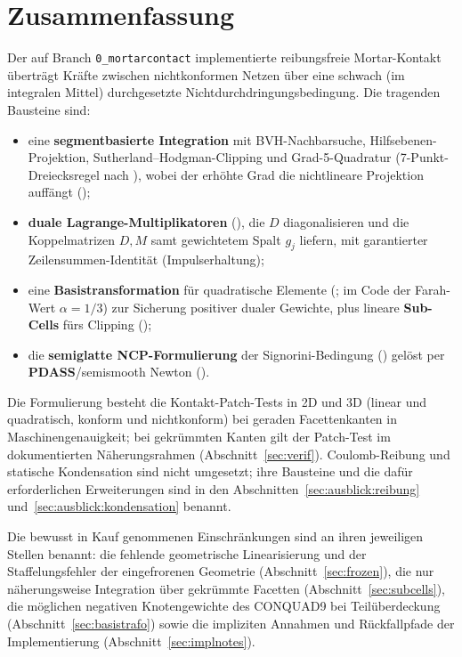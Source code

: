 \documentclass[a4paper,11pt]{article}
\def\bm#1{#1}%
\def\tfrac#1#2{#1/#2}%
\def\tilde#1{#1}%
\newcommand{\code}[1]{\texttt{\small #1}}
\let\stdsection\section
\renewcommand{\section}{\clearpage\stdsection}
\begin{document}
\section{Zusammenfassung}
\label{sec:zusammenfassung}

Der auf Branch \code{0\_mortarcontact} implementierte reibungsfreie Mortar-Kontakt überträgt Kräfte
zwischen nichtkonformen Netzen über eine schwach (im integralen Mittel) durchgesetzte
Nichtdurchdringungsbedingung. Die tragenden Bausteine sind:
\begin{itemize}\itemsep2pt
  \item eine \textbf{segmentbasierte Integration} mit BVH-Nachbarsuche, Hilfsebenen-Projektion,
        Sutherland--Hodgman-Clipping und Grad-5-Quadratur (7-Punkt-Dreiecksregel nach \citealt{dunavant1985}),
        wobei der erhöhte Grad die nichtlineare Projektion auffängt (\citealp{farah2015});
  \item \textbf{duale Lagrange-Multiplikatoren} (\citealp{wohlmuth2000}), die $\bm D$ diagonalisieren und die
        Koppelmatrizen $\bm D,\bm M$ samt gewichtetem Spalt $\tilde g_j$ liefern, mit garantierter
        Zeilensummen-Identität (Impulserhaltung);
  \item eine \textbf{Basistransformation} für quadratische Elemente (\citealp{popp2012}; im Code der
        Farah-Wert $\alpha=\tfrac13$) zur Sicherung positiver dualer Gewichte, plus lineare
        \textbf{Sub-Cells} fürs Clipping (\citealp{puso2008});
  \item die \textbf{semiglatte NCP-Formulierung} der Signorini-Bedingung (\citealp[Gl.~(55)]{gitterle})
        gelöst per \textbf{PDASS}/semismooth Newton (\citealp{hueber2005}).
\end{itemize}
Die Formulierung besteht die Kontakt-Patch-Tests in 2D und 3D (linear und quadratisch, konform und
nichtkonform) bei geraden Facettenkanten in Maschinengenauigkeit; bei gekrümmten Kanten gilt der
Patch-Test im dokumentierten Näherungsrahmen (Abschnitt~\ref{sec:verif}). Coulomb-Reibung und
statische Kondensation sind nicht umgesetzt; ihre Bausteine und die dafür erforderlichen
Erweiterungen sind in den Abschnitten~\ref{sec:ausblick:reibung}
und~\ref{sec:ausblick:kondensation} benannt.

\medskip
\noindent Die bewusst in Kauf genommenen Einschränkungen sind an ihren jeweiligen Stellen benannt:
die fehlende geometrische Linearisierung und der Staffelungsfehler der eingefrorenen Geometrie
(Abschnitt~\ref{sec:frozen}), die nur näherungsweise Integration über gekrümmte Facetten
(Abschnitt~\ref{sec:subcells}), die möglichen negativen Knotengewichte des CONQUAD9 bei
Teilüberdeckung (Abschnitt~\ref{sec:basistrafo}) sowie die impliziten Annahmen und Rückfallpfade
der Implementierung (Abschnitt~\ref{sec:implnotes}).
\end{document}

